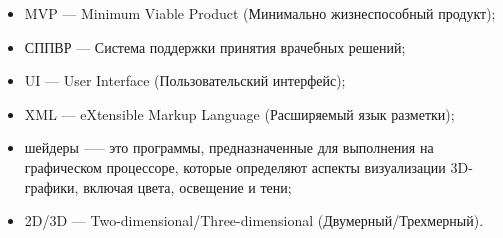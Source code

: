 \begin{itemize}
\item MVP --- Minimum Viable Product (Минимально жизнеспособный продукт);

\item СППВР --- Система поддержки принятия врачебных решений;

\item UI --- User Interface (Пользовательский интерфейс);

\item XML --- eXtensible Markup Language (Расширяемый язык разметки);

\item шейдеры —-- это программы, предназначенные для выполнения на графическом процессоре, которые определяют аспекты визуализации 3D-графики, включая цвета, освещение и тени;

\item 2D/3D --- Two-dimensional/Three-dimensional (Двумерный/Трехмерный).
\fi
\end{itemize}